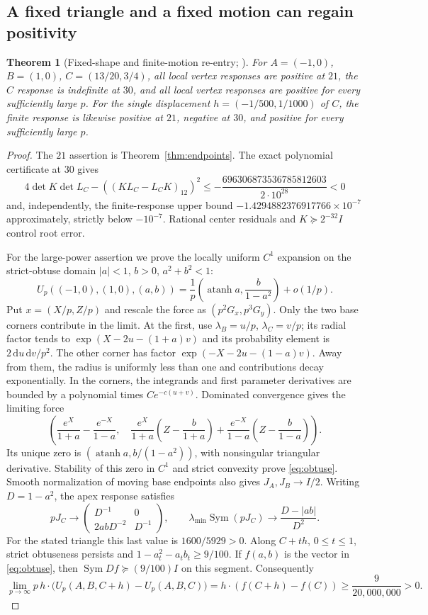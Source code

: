 \documentclass[11pt]{article}
\newtheorem{theorem}{Theorem}[section]
\theoremstyle{definition}
\newcommand{\Sym}{\operatorname{Sym}}
\newcommand{\dd}{\,\mathrm d}
\begin{document}
\subsection{A fixed triangle and a fixed motion can regain positivity}
\label{sec:reentry}
\begin{theorem}[Fixed-shape and finite-motion re-entry; \cite{Countercheck}]
For $A=(-1,0)$, $B=(1,0)$, $C=(13/20,3/4)$, all local vertex responses
are positive at $21$, the $C$ response is indefinite at $30$, and all
local vertex responses are positive for every sufficiently large $p$.
For the single displacement $h=(-1/500,1/1000)$ of $C$, the finite response
is likewise positive at $21$, negative at $30$, and positive for every
sufficiently large $p$.
\end{theorem}
\begin{proof}
The $21$ assertion is Theorem~\ref{thm:endpoints}. The exact polynomial
certificate at $30$ gives
\[
 4\det K\det L_C-((KL_C-L_CK)_{12})^2
 \le-\frac{696306873536785812603}{2\cdot10^{28}}<0
\]
and, independently, the finite-response upper bound
$-1.4294882376917766\times10^{-7}$ approximately, strictly below $-10^{-7}$.
Rational center residuals and $K\succeq2^{-32}I$ control root error.

For the large-power assertion we prove the locally uniform $C^1$ expansion
on the strict-obtuse domain $|a|<1$, $b>0$, $a^2+b^2<1$:
\begin{equation}\label{eq:obtuse}
 U_p((-1,0),(1,0),(a,b))
 =\frac1p\left(\operatorname{atanh}a,\frac b{1-a^2}\right)+o(1/p).
\end{equation}
Put $x=(X/p,Z/p)$ and rescale the force as $(p^2G_x,p^3G_y)$.
Only the two base corners contribute in the limit. At the first, use
$\lambda_B=u/p$, $\lambda_C=v/p$; its radial factor tends to
$\exp(X-2u-(1+a)v)$ and its probability element is $2\dd u\dd v/p^2$.
The other corner has factor $\exp(-X-2u-(1-a)v)$. Away from them,
the radius is uniformly less than one and contributions decay exponentially.
In the corners, the integrands and first parameter derivatives are bounded
by a polynomial times $Ce^{-c(u+v)}$. Dominated convergence gives the
limiting force
\[
 \left(\frac{e^X}{1+a}-\frac{e^{-X}}{1-a},\quad
 \frac{e^X}{1+a}\left(Z-\frac b{1+a}\right)
 +\frac{e^{-X}}{1-a}\left(Z-\frac b{1-a}\right)\right).
\]
Its unique zero is $(\operatorname{atanh}a,b/(1-a^2))$, with nonsingular
triangular derivative. Stability of this zero in $C^1$ and strict
convexity prove \eqref{eq:obtuse}. Smooth normalization of moving base
endpoints also gives $J_A,J_B\to I/2$.
Writing $D=1-a^2$, the apex response satisfies
\[
 pJ_C\longrightarrow
 \begin{pmatrix}D^{-1}&0\\2abD^{-2}&D^{-1}\end{pmatrix},\qquad
 \lambda_{\min}\Sym(pJ_C)\longrightarrow\frac{D-|ab|}{D^2}.
\]
For the stated triangle this last value is $1600/5929>0$.
Along $C+th$, $0\le t\le1$, strict obtuseness persists and
$1-a_t^2-a_tb_t\ge9/100$. If $f(a,b)$ is the vector in
\eqref{eq:obtuse}, then $\Sym Df\succeq(9/100)I$ on this segment.
Consequently
\[
 \lim_{p\to\infty}p\,h\cdot\bigl(U_p(A,B,C+h)-U_p(A,B,C)\bigr)
 =h\cdot(f(C+h)-f(C))\ge\frac9{20{,}000{,}000}>0.
\]
\end{proof}
\end{document}
